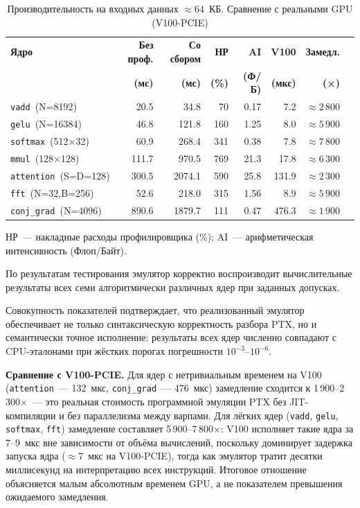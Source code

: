 \begin{table}[h]
  \caption{Производительность на входных данных $\approx 64$~КБ. Сравнение с реальными GPU (V100-PCIE)}
  \label{tab:integration_results}
  \centering
  \footnotesize
  \begin{tabular}{lrrrrrrr}
    \toprule
    \textbf{Ядро} &
    \textbf{Без проф.} & \textbf{Со сбором} & \textbf{НР} &
    \textbf{AI} &
    \textbf{V100} &
    \textbf{Замедл.} \\
    & \textbf{(мс)} & \textbf{(мс)} & \textbf{(\%)} & \textbf{(Ф/Б)} &
    \textbf{(мкс)} & \textbf{(×)} \\
    \midrule
    \texttt{vadd}~(N=8192)       &   20.5 &   34.8 &  70 & 0.17 &   7.2 &  $\approx 2\,800$ \\
    \texttt{gelu}~(N=16384)      &   46.8 &  121.8 & 160 & 1.25 &   8.0 &  $\approx 5\,900$ \\
    \texttt{softmax}~(512×32)    &   60.9 &  268.4 & 341 & 0.38 &   7.8 &  $\approx 7\,800$ \\
    \texttt{mmul}~(128×128)      &  111.7 &  970.5 & 769 & 21.3 &  17.8 &  $\approx 6\,300$ \\
    \texttt{attention}~(S=D=128) &  300.5 & 2074.1 & 590 & 25.8 & 131.9 &  $\approx 2\,300$ \\
    \texttt{fft}~(N=32,B=256)    &   52.6 &  218.0 & 315 & 1.56 &   8.9 &  $\approx 5\,900$ \\
    \texttt{conj\_grad}~(N=4096) &  890.6 & 1879.7 & 111 & 0.47 & 476.3 &  $\approx 1\,900$ \\
    \bottomrule
  \end{tabular}
  \begin{flushleft}
  {\footnotesize НР~--- накладные расходы профилировщика (\%);
  AI~--- арифметическая интенсивность (Флоп/Байт).}
  \end{flushleft}
\end{table}

По результатам тестирования эмулятор корректно воспроизводит вычислительные
результаты всех семи алгоритмически различных ядер при заданных допусках.

Совокупность показателей подтверждает, что реализованный эмулятор
обеспечивает не только синтаксическую корректность разбора PTX,
но и семантически точное исполнение: результаты всех ядер численно
совпадают с CPU-эталонами при жёстких порогах погрешности $10^{-3}$--$10^{-6}$.

\textbf{Сравнение с V100-PCIE.}
Для ядер с нетривиальным временем на V100 (\texttt{attention}~--- 132~мкс,
\texttt{conj\_grad}~--- 476~мкс) замедление сходится к 1\,900--2\,300$\times$~---
это реальная стоимость программной эмуляции PTX
без JIT-компиляции и без параллелизма между варпами.
Для лёгких ядер (\texttt{vadd}, \texttt{gelu}, \texttt{softmax}, \texttt{fft})
замедление составляет 5\,900--7\,800$\times$: V100 исполняет такие ядра
за 7--9~мкс вне зависимости от объёма вычислений, поскольку доминирует
задержка запуска ядра ($\approx$7~мкс на V100-PCIE), тогда как эмулятор
тратит десятки миллисекунд на интерпретацию всех инструкций.
Итоговое отношение объясняется малым абсолютным временем GPU,
а не показателем превышения ожидаемого замедления.

